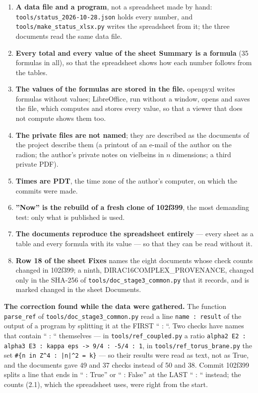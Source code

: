 \documentclass[10pt,a4paper]{article}
\begin{document}
\begin{enumerate}
\item \textbf{A data file and a program}, not a spreadsheet made by hand: \texttt{tools/\allowbreak{}status\_\allowbreak{}2026-10-28.json} holds every number, and \texttt{tools/\allowbreak{}make\_\allowbreak{}status\_\allowbreak{}xlsx.py} writes the spreadsheet from it; the three documents read the same data file.
\item \textbf{Every total and every value of the sheet Summary is a formula} (35 formulas in all), so that the spreadsheet shows how each number follows from the tables.
\item \textbf{The values of the formulas are stored in the file.} openpyxl writes formulas without values; LibreOffice, run without a window, opens and saves the file, which computes and stores every value, so that a viewer that does not compute shows them too.
\item \textbf{The private files are not named}; they are described as the documents of the project describe them (a printout of an e-mail of the author on the radion; the author’s private notes on vielbeins in $n$ dimensions; a third private PDF).
\item \textbf{Times are PDT}, the time zone of the author’s computer, on which the commits were made.
\item \textbf{”Now” is the rebuild of a fresh clone of 102f399}, the most demanding test: only what is published is used.
\item \textbf{The documents reproduce the spreadsheet entirely} — every sheet as a table and every formula with its value — so that they can be read without it.
\item \textbf{Row 18 of the sheet Fixes} names the eight documents whose check counts changed in 102f399; a ninth, DIRAC16COMPLEX\_PROVENANCE, changed only in the SHA-256 of \texttt{tools/\allowbreak{}doc\_\allowbreak{}stage3\_\allowbreak{}common.py} that it records, and is marked changed in the sheet Documents.
\end{enumerate}
\textbf{The correction found while the data were gathered.} The function \texttt{parse\_\allowbreak{}ref} of \texttt{tools/\allowbreak{}doc\_\allowbreak{}stage3\_\allowbreak{}common.py} read a line \texttt{name : result} of the output of a program by splitting it at the FIRST “ : “. Two checks have names that contain “ : “ themselves — in \texttt{tools/\allowbreak{}ref\_\allowbreak{}coupled.py} a ratio \texttt{alpha2 E2 : alpha3 E3 : kappa eps -> 9/\allowbreak{}4 : -5/\allowbreak{}4 : 1}, in \texttt{tools/\allowbreak{}ref\_\allowbreak{}torus\_\allowbreak{}brane.py} the set \texttt{\#\{n in Z\textasciicircum{}4 : |n|\textasciicircum{}2 = k\}} — so their results were read as text, not as True, and the documents gave 49 and 37 checks instead of 50 and 38. Commit 102f399 splits a line that ends in “ : True” or “ : False” at the LAST “ : “ instead; the counts (2.1), which the spreadsheet uses, were right from the start.
\end{document}
